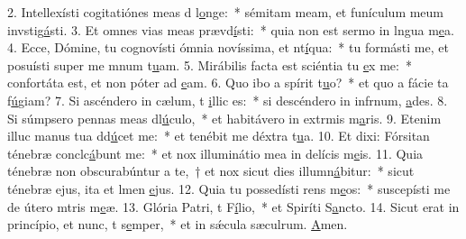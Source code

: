 2. Intellexísti cogitatiónes meas d l\uline{o}nge:~* sémitam meam, et funículum meum invstig\uline{á}sti.
3. Et omnes vias meas prævd\uline{í}sti:~* quia non est sermo in lngua m\uline{e}a.
4. Ecce, Dómine, tu cognovísti ómnia novíssima, et nt\uline{í}qua:~* tu formásti me, et posuísti super me mnum t\uline{u}am.
5. Mirábilis facta est sciéntia tu \uline{e}x me:~* confortáta est, et non póter ad \uline{e}am.
6. Quo ibo a spírit t\uline{u}o?~* et quo a fácie ta f\uline{ú}giam?
7. Si ascéndero in cælum, t \uline{i}llic es:~* si descéndero in infrnum, \uline{a}des.
8. Si súmpsero pennas meas dl\uline{ú}culo,~* et habitávero in extrmis m\uline{a}ris.
9. Etenim illuc manus tua dd\uline{ú}cet me:~* et tenébit me déxtra t\uline{u}a.
10. Et dixi: Fórsitan ténebræ conclc\uline{á}bunt me:~* et nox illuminátio mea in delícis m\uline{e}is.
11. Quia ténebræ non obscurabúntur a te,~† et nox sicut dies illumn\uline{á}bitur:~* sicut ténebræ ejus, ita et lmen \uline{e}jus.
12. Quia tu possedísti rens m\uline{e}os:~* suscepísti me de útero mtris m\uline{e}æ.
13. Glória Patri, t F\uline{í}lio,~* et Spiríti S\uline{a}ncto.
14. Sicut erat in princípio, et nunc, t s\uline{e}mper,~* et in sǽcula sæculrum. \uline{A}men.
